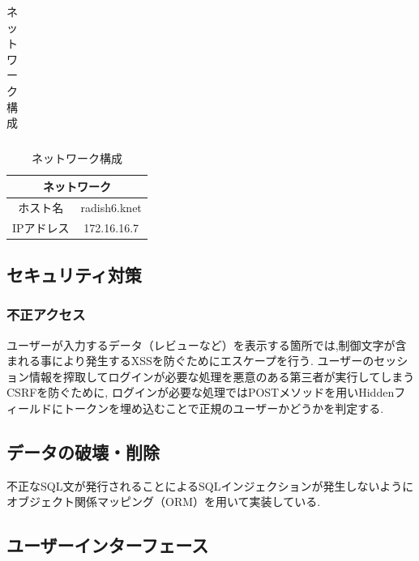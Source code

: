 \documentclass[a4paper]{ltjsarticle}
\begin{document}
\begin{table}[h]
\begin{minipage}[t]{.39\textwidth}
\begin{tabular}{|c||c|}
                \end{tabular}
                \hspace{1\textwidth}
                \caption{ネットワーク構成}
                \label{tab:network}
                \begin{tabular}{|c||c|}
                    \hline
                    \multicolumn{2}{|c|}{ネットワーク} \\ \hline \hline
                    ホスト名 & radish6.knet \\ \hline
                    IPアドレス & 172.16.16.7 \\ \hline
                \end{tabular}
            \end{minipage}
        \end{table}

\subsection{セキュリティ対策}
    \subsubsection{不正アクセス}
        ユーザーが入力するデータ（レビューなど）を表示する箇所では,制御文字が含まれる事により発生するXSSを防ぐためにエスケープを行う.
        ユーザーのセッション情報を搾取してログインが必要な処理を悪意のある第三者が実行してしまうCSRFを防ぐために,
        ログインが必要な処理ではPOSTメソッドを用いHiddenフィールドにトークンを埋め込むことで正規のユーザーかどうかを判定する.
    \subsection{データの破壊・削除}
        不正なSQL文が発行されることによるSQLインジェクションが発生しないようにオブジェクト関係マッピング（ORM）を用いて実装している.

\subsection{ユーザーインターフェース}
\end{document}
